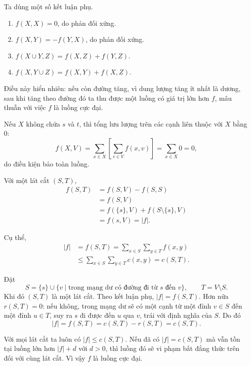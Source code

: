 \documentclass[11pt]{article}
\begin{document}
Ta dùng một số kết luận phụ.

\begin{enumerate}
  \item $f(X,X)=0$, do phản đối xứng.
  \item $f(X,Y)=-f(Y,X)$, do phản đối xứng.
  \item $f(X\cup Y,Z)=f(X,Z)+f(Y,Z)$.
  \item $f(X,Y\cup Z)=f(X,Y)+f(X,Z)$.
\end{enumerate}

 Điều này hiển nhiên: nếu còn đường tăng,
vì dung lượng tăng ít nhất là dương, sau khi tăng theo đường đó ta thu được
một luồng có giá trị lớn hơn $f$, mâu thuẫn với việc $f$ là luồng cực đại.

 Nếu $X$ không
chứa $s$ và $t$, thì tổng lưu lượng trên các cạnh liên thuộc với $X$ bằng
$0$:
\[
  f(X,V)=\sum_{x\in X}\left[\sum_{v\in V} f(x,v)\right]
        =\sum_{x\in X}0=0,
\]
do điều kiện bảo toàn luồng.

 Với một lát
cắt $(S,T)$,
\[
\begin{aligned}
  f(S,T)
    &=f(S,V)-f(S,S)\\
    &=f(S,V)\\
    &=f(\{s\},V)+f(S\setminus\{s\},V)\\
    &=f(s,V)=|f|.
\end{aligned}
\]

 Cụ thể,
\[
\begin{aligned}
  |f|
    &=f(S,T)
      =\sum_{x\in S}\sum_{y\in T} f(x,y)\\
    &\le \sum_{x\in S}\sum_{y\in T} c(x,y)
      =c(S,T).
\end{aligned}
\]

 Đặt
\[
  S=\{s\}\cup\{v\mid \text{trong mạng dư có đường đi từ }s\text{ đến }v\},
  \qquad T=V\setminus S.
\]
Khi đó $(S,T)$ là một lát cắt. Theo kết luận phụ, $|f|=f(S,T)$. Hơn nữa
$r(S,T)=0$: nếu không, trong mạng dư sẽ có một cạnh từ một đỉnh $v\in S$ đến
một đỉnh $u\in T$, suy ra $s$ đi được đến $u$ qua $v$, trái với định nghĩa
của $S$. Do đó
\[
  |f|=f(S,T)=c(S,T)-r(S,T)=c(S,T).
\]

 Với mọi lát cắt ta luôn có
$|f|\le c(S,T)$. Nếu đã có $|f|=c(S,T)$ mà vẫn tồn tại luồng lớn hơn
$|f|+d$ với $d>0$, thì luồng đó sẽ vi phạm bất đẳng thức trên đối với cùng lát
cắt. Vì vậy $f$ là luồng cực đại.
\end{document}
